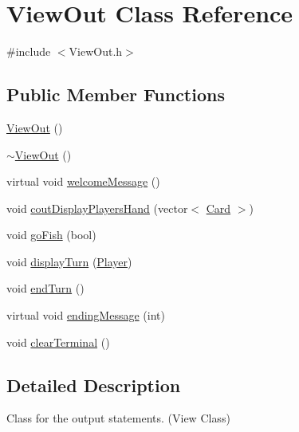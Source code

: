 \hypertarget{class_view_out}{\section{View\-Out Class Reference}
\label{class_view_out}
}


{\ttfamily \#include $<$View\-Out.\-h$>$}

\subsection*{Public Member Functions}
\begin{DoxyCompactItemize}
\item 
\hyperlink{class_view_out_a14f3add702732074db9384a4c83f1e52}{View\-Out} ()
\item 
\hyperlink{class_view_out_a8849b000eaa67af379c8257622107b67}{$\sim$\-View\-Out} ()
\item 
virtual void \hyperlink{class_view_out_a4689f97048cd61ab7df83a3158d03ee7}{welcome\-Message} ()
\item 
void \hyperlink{class_view_out_aa284dd2c46946728bfbeb61f79bdbc1c}{cout\-Display\-Players\-Hand} (vector$<$ \hyperlink{class_card}{Card} $>$)
\item 
void \hyperlink{class_view_out_a58d07bdb6de0532e22c60cf047d9c759}{go\-Fish} (bool)
\item 
void \hyperlink{class_view_out_adc9f94c7824bbaf97193cf51a06088dc}{display\-Turn} (\hyperlink{class_player}{Player})
\item 
void \hyperlink{class_view_out_aa291feabf462bcc2144290372692ef93}{end\-Turn} ()
\item 
virtual void \hyperlink{class_view_out_a638e1964ff9b7f796dcf4aec4056ac47}{ending\-Message} (int)
\item 
void \hyperlink{class_view_out_a1414ca6b1726f56c7f1592d6d7b3ecc6}{clear\-Terminal} ()
\end{DoxyCompactItemize}


\subsection{Detailed Description}
Class for the output statements. (View Class) 

